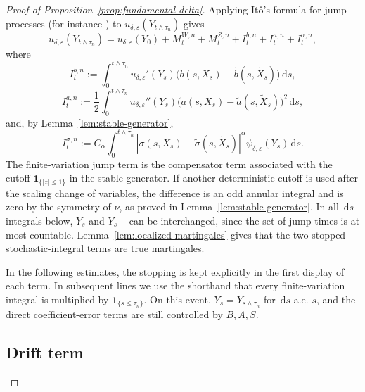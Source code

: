 \documentclass[11pt]{article}
\newcommand{\1}{\mathbf{1}}
\newcommand{\dd}{\,\mathrm{d}}
\newcommand{\wt}{\tilde}
\newcommand{\eps}{\varepsilon}
\begin{document}
\begin{proof}[Proof of Proposition~\ref{prop:fundamental-delta}]
Applying It\^o's formula for jump processes (for instance \cite[Theorem~4.4.7]{Applebaum2009}) to $u_{\delta,\eps}(Y_{t\wedge\tau_n})$ gives
\begin{equation}\label{eq:ito}
  u_{\delta,\eps}(Y_{t\wedge\tau_n})=u_{\delta,\eps}(Y_0)+M_{t}^{W,n}+M_{t}^{Z,n}+I_t^{b,n}+I_t^{a,n}+I_t^{\sigma,n},
\end{equation}
where
\[
I_t^{b,n}:=\int_0^{t\wedge\tau_n} u_{\delta,\eps}'(Y_s)
\bigl(b(s,X_s)-\wt b(s,\wt X_s)\bigr)\dd s,
\]
\[
I_t^{a,n}:=\frac12\int_0^{t\wedge\tau_n} u_{\delta,\eps}''(Y_s)
\bigl(a(s,X_s)-\wt a(s,\wt X_s)\bigr)^2\dd s,
\]
and, by Lemma~\ref{lem:stable-generator},
\[
I_t^{\sigma,n}:=C_\alpha\int_0^{t\wedge\tau_n} |\sigma(s,X_s)-\wt\sigma(s,\wt X_s)|^\alpha
\psi_{\delta,\eps}(Y_s)\dd s.
\]
The finite-variation jump term is the compensator term associated with the cutoff $\1_{\{|z|\le1\}}$ in the stable generator. If another deterministic cutoff is used after the scaling change of variables, the difference is an odd annular integral and is zero by the symmetry of $\nu$, as proved in Lemma~\ref{lem:stable-generator}. In all $\dd s$ integrals below, $Y_s$ and $Y_{s-}$ can be interchanged, since the set of jump times is at most countable. Lemma~\ref{lem:localized-martingales} gives that the two stopped stochastic-integral terms are true martingales.

In the following estimates, the stopping is kept explicitly in the first display of each term. In subsequent lines we use the shorthand that every finite-variation integral is multiplied by $\1_{\{s\le\tau_n\}}$. On this event, $Y_s=Y_{s\wedge\tau_n}$ for $\dd s$-a.e. $s$, and the direct coefficient-error terms are still controlled by $B,A,S$.

\subsection{Drift term}
\label{subsec:drift-term}


\end{proof}
\end{document}
